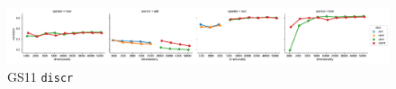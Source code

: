 \begin{figure}
  \centering

  \includegraphics[width=1.1\textwidth]{supplement/figures/gs11-interaction-discr}

  \caption{GS11 \texttt{discr}}
  \label{fig:gs11-discr}
\end{figure}

